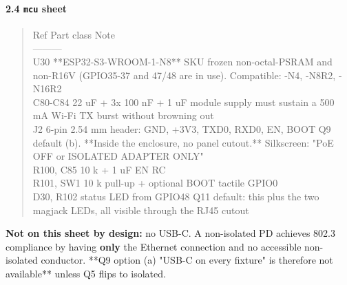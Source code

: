 \documentclass[11pt,a4paper]{article}
\begin{document}
\paragraph*{2.4 \texttt{mcu} sheet}
\begin{quote}\small\ttfamily\raggedright
\textbar{} Ref \textbar{} Part class \textbar{} Note \textbar{}\\
\textbar{}---\textbar{}---\textbar{}---\textbar{}\\
\textbar{} U30 \textbar{} {*}{*}ESP32-S3-WROOM-1-N8{*}{*} \textbar{} SKU frozen non-octal-PSRAM and non-R16V (GPIO35-37 and 47/48 are in use). Compatible: -N4, -N8R2, -N16R2 \textbar{}\\
\textbar{} C80-C84 \textbar{} 22 uF + 3x 100 nF + 1 uF \textbar{} module supply must sustain a 500 mA Wi-Fi TX burst without browning out \textbar{}\\
\textbar{} J2 \textbar{} 6-pin 2.54 mm header: GND, +3V3, TXD0, RXD0, EN, BOOT \textbar{} Q9 default (b). {*}{*}Inside the enclosure, no panel cutout.{*}{*} Silkscreen: "PoE OFF or ISOLATED ADAPTER ONLY" \textbar{}\\
\textbar{} R100, C85 \textbar{} 10 k + 1 uF EN RC \textbar{} \textbar{}\\
\textbar{} R101, SW1 \textbar{} 10 k pull-up + optional BOOT tactile \textbar{} GPIO0 \textbar{}\\
\textbar{} D30, R102 \textbar{} status LED from GPIO48 \textbar{} Q11 default: this plus the two magjack LEDs, all visible through the RJ45 cutout \textbar{}
\end{quote}
\textbf{Not on this sheet by design:} no USB-C. A non-isolated PD achieves 802.3 compliance by having \textbf{only} the Ethernet connection and no accessible non-isolated conductor. {*}{*}Q9 option (a) "USB-C on every fixture" is therefore not available{*}{*} unless Q5 flips to isolated.
\end{document}
